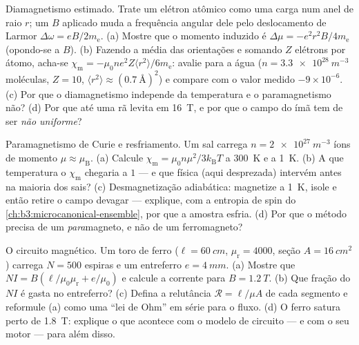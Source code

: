 \begin{exercise}[$\star\star$]\label{exo:b3:electromagnetism-in-matter:8}
Diamagnetismo estimado. Trate um elétron atômico como uma carga num
anel de raio $r$; um $B$ aplicado muda a frequência angular dele pelo
deslocamento de Larmor $\Delta\omega = eB/2m_{\text{e}}$. (a) Mostre que o
momento induzido é $\Delta\mu = -e^2r^2B/4m_{\text{e}}$ (opondo-se a
$B$). (b) Fazendo a média das orientações e somando $Z$ elétrons por
átomo, acha-se $\chi_{\text{m}} = -\mu_0ne^2Z\langle
r^2\rangle/6m_{\text{e}}$: avalie para a água ($n =
\qty{3.3e28}{m^{-3}}$ moléculas, $Z = 10$, $\langle r^2\rangle
\approx (\qty{0.7}{\angstrom})^2$) e compare com o valor medido
$-9\times10^{-6}$. (c) Por que o diamagnetismo independe da temperatura
e o paramagnetismo não? (d) Por que até uma rã levita em
\qty{16}{T}, e por que o campo do ímã tem de ser \emph{não uniforme}?
\end{exercise}

\begin{exercise}[$\star\star$]\label{exo:b3:electromagnetism-in-matter:9}
Paramagnetismo de Curie e resfriamento. Um sal carrega $n =
\qty{2e27}{m^{-3}}$ íons de momento $\mu \approx \mu_{\text{B}}$.
(a) Calcule $\chi_{\text{m}} = \mu_0n\mu^2/3k_{\text{B}}T$ a
\qty{300}{K} e a \qty{1}{K}. (b) A que temperatura o
$\chi_{\text{m}}$ chegaria a $1$ --- e que física (aqui desprezada)
intervém antes na maioria dos sais? (c) Desmagnetização adiabática:
magnetize a \qty{1}{K}, isole e então retire o campo devagar ---
explique, com a entropia de spin do
\cref{ch:b3:microcanonical-ensemble}, por que a amostra esfria. (d) Por
que o método precisa de um \emph{para}magneto, e não de um ferromagneto?
\end{exercise}

\begin{exercise}[$\star\star\star$]\label{exo:b3:electromagnetism-in-matter:10}
O circuito magnético. Um toro de ferro ($\ell = \qty{60}{cm}$,
$\mu_{\text{r}} = 4000$, seção $A = \qty{16}{cm^2}$) carrega
$N = 500$ espiras e um entreferro $e = \qty{4}{mm}$. (a) Mostre que $NI =
B(\ell/\mu_0\mu_{\text{r}} + e/\mu_0)$ e calcule a corrente para
$B = \qty{1.2}{T}$. (b) Que fração do $NI$ é gasta no entreferro?
(c) Defina a relutância $\mathcal R = \ell/\mu A$ de cada
segmento e reformule (a) como uma ``lei de Ohm'' em série para o fluxo. (d)
O ferro satura perto de \qty{1.8}{T}: explique o que acontece com o
modelo de circuito --- e com o seu motor --- para além disso.
\end{exercise}

